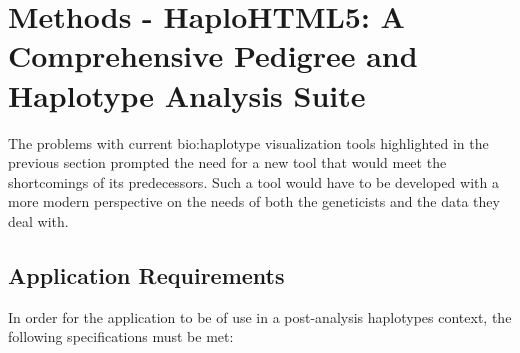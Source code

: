 \chapter[Methods - HaploHTML5: A Comprehensive Pedigree and\\Haplotype Analysis Suite]{Methods - HaploHTML5: A\\Comprehensive Pedigree and\\Haplotype Analysis Suite}

\vspace{10pt}
The problems with current \gls{bio:haplotype} visualization tools highlighted in the previous section prompted the need for a new tool that would meet the shortcomings of its predecessors. Such a tool would have to be developed with a more modern perspective on the needs of both the geneticists and the data they deal with.

\section{Application Requirements}

In order for the application to be of use in a post-analysis haplotypes context, the following specifications must be met:


